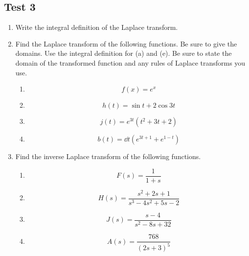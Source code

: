 \subsection{Test 3}

\begin{enumerate}[label=\arabic*.]
	\item
		Write the integral definition of the Laplace transform.
	\item 
		Find the Laplace transform of the following functions. Be sure to give the domains. Use the integral definition for (a) and (e). Be sure to state the domain of the transformed function and any rules of Laplace transforms you use.
		\begin{enumerate}[label = (\alph*)]
			\item
				\begin{equation*}
					f(x) = e^x
				\end{equation*}
			\item
				\begin{equation*}
					h(t) = \sin{t} + 2\cos{3t}
				\end{equation*}
			\item
				\begin{equation*}
					j(t) = e^{3t}\left(t^2 + 3t + 2\right)
				\end{equation*}
			\item
				\begin{equation*}
					b(t) = \dd{}{t}{(e^{3t+1} + e^{1-t})}
				\end{equation*}
		\end{enumerate}
	\item
		Find the inverse Laplace transform of the following functions.
		\begin{enumerate}[label=(\alph*)]
			\item
				\begin{equation*}
					F(s) = \frac{1}{1+s}
				\end{equation*}
			\item
				\begin{equation*}
					H(s) = \frac{s^2+2s+1}{s^3 - 4s^2 + 5s - 2}
				\end{equation*}
			\item
				\begin{equation*}
					J(s) = \frac{s-4}{s^2 -8s + 32}
				\end{equation*}
			\item
				\begin{equation*}
					A(s) = \frac{768}{(2s+3)^5}
				\end{equation*}

\end{enumerate}
\end{enumerate}

